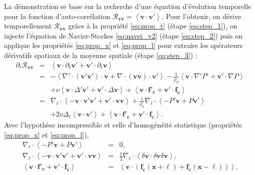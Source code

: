 La démonstration se base sur la recherche d'une équation d'évolution temporelle pour la fonction d'auto-corrélation $\mathcal{R}_{\boldsymbol{v}\boldsymbol{v}} = \left<\boldsymbol{v} \cdot \boldsymbol{v'}\right>$. Pour l'obtenir, on dérive temporellement $\mathcal{R}_{\boldsymbol{v}\boldsymbol{v}}$ grâce à la propriété \eqref{eq:prop_t} (étape \eqref{eq:step_1}), on injecte l'équation de Navier-Stockes \eqref{eq:navst_v2} (étape \eqref{eq:step_2}) puis on applique les propriétés \eqref{eq:prop_x} et \eqref{eq:prop_l} pour extraire les opérateurs dérivatifs spatiaux de la moyenne spatiale (étape \eqref{eq:step_3}) : 
\begin{eqnarray}
    \partial_t \mathcal{R}_{\boldsymbol{v}\boldsymbol{v}} &=& \left<\boldsymbol{v} \cdot \partial_t \boldsymbol{v'} + \boldsymbol{v'} \cdot \partial_t \boldsymbol{v}\right> \label{eq:step_1} \\ 
    &=& - \left< \nabla' \cdot (\boldsymbol{v'} \boldsymbol{v'}) \cdot \boldsymbol{v}   +  \nabla \cdot (\boldsymbol{v} \boldsymbol{v})\cdot\boldsymbol{v'} \right> - \frac{1}{\rho_0} \left<\boldsymbol{v} \cdot \nabla' P' + \boldsymbol{v'} \cdot \nabla P\right>  \nonumber \\
    && + \nu \left<\boldsymbol{v} \cdot \Delta' \boldsymbol{v'} + \boldsymbol{v'} \cdot \Delta \boldsymbol{v}\right> + \left<\boldsymbol{v} \cdot \boldsymbol{f'_c} + \boldsymbol{v'} \cdot \boldsymbol{f_c}\right> \label{eq:step_2} \\  
    &=& \nabla_{\boldsymbol{\ell}} \cdot \left< - \boldsymbol{v} \cdot \boldsymbol{v'} \boldsymbol{v'} + \boldsymbol{v'} \cdot \boldsymbol{v} \boldsymbol{v}\right>  + \frac{1}{\rho_0} \nabla_{\boldsymbol{\ell}} \cdot \left< - P' \boldsymbol{v} + P \boldsymbol{v'}\right> \nonumber \\
    && + 2 \nu \Delta_{\boldsymbol{\ell}} \left<\boldsymbol{v} \cdot \boldsymbol{v'} \right>  + \left<\boldsymbol{v} \cdot \boldsymbol{f'_c} + \boldsymbol{v'} \cdot \boldsymbol{f_c}\right>  \label{eq:step_3}  
.\end{eqnarray}
Avec l'hypothèse incompressible et celle d'homogénéité statistique (propriétés \eqref{eq:prop_x} et \eqref{eq:prop_l}), 
\begin{eqnarray}
    \nabla_{\boldsymbol{\ell}} \cdot \left< - P' \boldsymbol{v} + P \boldsymbol{v'}\right> &=& 0, \\
    \nabla_{\boldsymbol{\ell}} \cdot \left< - \boldsymbol{v} \cdot \boldsymbol{v'} \boldsymbol{v'} + \boldsymbol{v'} \cdot \boldsymbol{v} \boldsymbol{v}\right> &=& \frac{1}{2} \nabla_{\boldsymbol{\ell}} \cdot \left< \delta \boldsymbol{v} \cdot \delta \boldsymbol{v} \delta \boldsymbol{v} \right>, \\
    \left<\boldsymbol{v} \cdot \boldsymbol{f'_c} + \boldsymbol{v'} \cdot \boldsymbol{f_c}\right> &=& \left<\boldsymbol{v} \cdot \left(\boldsymbol{f_c}\left(\mathbf{x}+\boldsymbol{\ell}\right) +  \boldsymbol{f_c}\left(\mathbf{x}-\boldsymbol{\ell}\right)\right)\right>
.\end{eqnarray}

